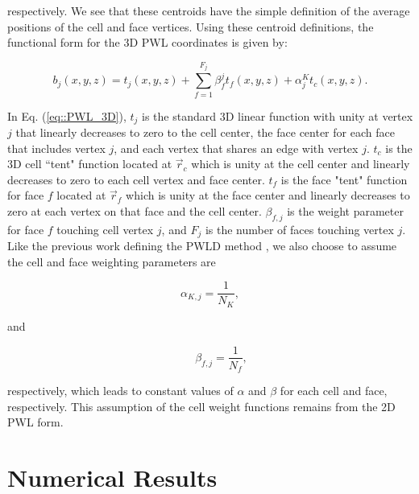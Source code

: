 \noindent respectively. We see that these centroids have the simple definition of the average positions of the cell and face vertices. Using these centroid definitions, the functional form for the 3D PWL coordinates is given by:

\begin{equation}
\label{eq::PWL_3D}
	b_j (x,y,z)  = t_j  (x,y,z) + \sum_{f=1}^{F_j} \beta_f^j  t_f (x,y,z) + \alpha_j^K t_c  (x,y,z) .
\end{equation}

\noindent In Eq. (\ref{eq::PWL_3D}), $t_j$ is the standard 3D linear function with unity at vertex $j$ that linearly decreases to zero to the cell center, the face center for each face that includes vertex $j$, and each vertex that shares an edge with vertex $j$. $t_c$ is the 3D cell ``tent" function located at $\vec{r}_c$ which is unity at the cell center and linearly decreases to zero to each cell vertex and face center. $t_f$ is the face "tent" function for face $f$ located at $\vec{r}_{f}$ which is unity at the face center and linearly decreases to zero at each vertex on that face and the cell center. $\beta_{f,j}$ is the weight parameter for face $f$ touching cell vertex $j$, and $F_j$ is the number of faces touching vertex $j$. Like the previous work defining the PWLD method \cite{bailey2008phd}, we also choose to assume the cell and face weighting parameters are

\begin{equation}
\alpha_{K,j} = \frac{1}{N_K},
\label{eq::PWL_center_weight_val}
\end{equation}

\noindent and

\begin{equation}
\qquad \beta_{f,j} = \frac{1}{N_f},
\label{eq::PWL_face_weight_val}
\end{equation}

\noindent respectively, which leads to constant values of $\alpha$ and $\beta$ for each cell and face, respectively. This assumption of the cell weight functions remains from the 2D PWL form. 



\section{Numerical Results}
\label{sec::BF_Results}

